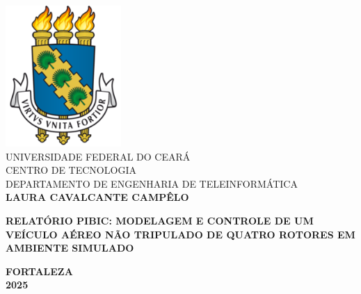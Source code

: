 



\clearpage
\thispagestyle{empty}

\begin{bfseries}
\begin{center}

\includegraphics[scale=0.45]{figs/ufc.png} \\
\vspace{-4pt} 
UNIVERSIDADE FEDERAL DO CEARÁ \\
\vspace{4pt} 
CENTRO DE TECNOLOGIA \\
\vspace{4pt} 
DEPARTAMENTO DE ENGENHARIA DE TELEINFORMÁTICA \\

\vspace*{\fill}
\textbf{LAURA CAVALCANTE CAMPÊLO}
\vspace*{\fill}

\vspace*{\fill}
\textbf{RELATÓRIO PIBIC: MODELAGEM E CONTROLE DE UM VEÍCULO AÉREO NÃO TRIPULADO DE QUATRO ROTORES EM AMBIENTE SIMULADO}
\vspace*{\fill}

\vspace*{\fill}
\textbf{FORTALEZA}\\
\textbf{2025}

\end{center}

\end{bfseries}

\newpage
\tableofcontents
\newpage













